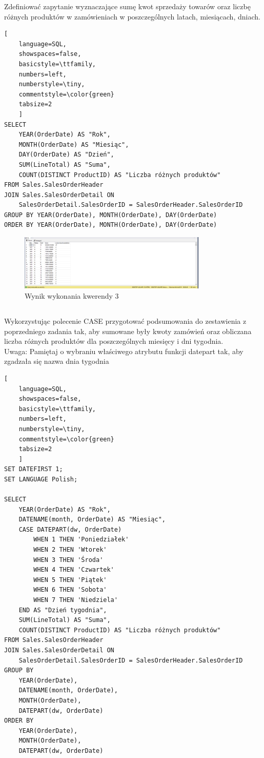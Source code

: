 \documentclass[a4paper,12pt]{article}
\begin{document}
Zdefiniować zapytanie wyznaczające sumę kwot sprzedaży towarów oraz liczbę różnych produktów w zamówieniach w poszczególnych latach, miesiącach, dniach.

\begin{lstlisting}[
    language=SQL,
    showspaces=false,
    basicstyle=\ttfamily,
    numbers=left,
    numberstyle=\tiny,
    commentstyle=\color{green}
    tabsize=2
    ]
SELECT 
    YEAR(OrderDate) AS "Rok", 
    MONTH(OrderDate) AS "Miesiąc", 
    DAY(OrderDate) AS "Dzień", 
    SUM(LineTotal) AS "Suma", 
    COUNT(DISTINCT ProductID) AS "Liczba różnych produktów"
FROM Sales.SalesOrderHeader
JOIN Sales.SalesOrderDetail ON 
    SalesOrderDetail.SalesOrderID = SalesOrderHeader.SalesOrderID
GROUP BY YEAR(OrderDate), MONTH(OrderDate), DAY(OrderDate)
ORDER BY YEAR(OrderDate), MONTH(OrderDate), DAY(OrderDate)
\end{lstlisting}

\begin{figure}[H]
    \centering
    \includegraphics[width=0.8\textwidth]{images/03.png}
    \caption{Wynik wykonania kwerendy 3}
\end{figure}

\subsection{}

Wykorzystując polecenie CASE przygotować podsumowania do zestawienia z poprzedniego zadania tak, aby sumowane były kwoty zamówień oraz obliczana liczba różnych produktów dla poszczególnych miesięcy i dni tygodnia.\\
Uwaga: Pamiętaj o wybraniu właściwego atrybutu funkcji datepart tak, aby zgadzała się nazwa dnia tygodnia

\begin{lstlisting}[
    language=SQL,
    showspaces=false,
    basicstyle=\ttfamily,
    numbers=left,
    numberstyle=\tiny,
    commentstyle=\color{green}
    tabsize=2
    ]
SET DATEFIRST 1;
SET LANGUAGE Polish;

SELECT 
    YEAR(OrderDate) AS "Rok", 
    DATENAME(month, OrderDate) AS "Miesiąc",     
    CASE DATEPART(dw, OrderDate)
        WHEN 1 THEN 'Poniedziałek'
        WHEN 2 THEN 'Wtorek'
        WHEN 3 THEN 'Środa'
        WHEN 4 THEN 'Czwartek'
        WHEN 5 THEN 'Piątek'
        WHEN 6 THEN 'Sobota'
        WHEN 7 THEN 'Niedziela'
    END AS "Dzień tygodnia", 
    SUM(LineTotal) AS "Suma", 
    COUNT(DISTINCT ProductID) AS "Liczba różnych produktów"
FROM Sales.SalesOrderHeader
JOIN Sales.SalesOrderDetail ON 
    SalesOrderDetail.SalesOrderID = SalesOrderHeader.SalesOrderID
GROUP BY 
    YEAR(OrderDate), 
    DATENAME(month, OrderDate),
    MONTH(OrderDate),
    DATEPART(dw, OrderDate)
ORDER BY 
    YEAR(OrderDate), 
    MONTH(OrderDate), 
    DATEPART(dw, OrderDate)
\end{lstlisting}
\end{document}
